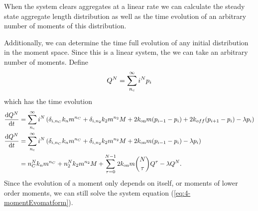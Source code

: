 When the system clears aggregates at a linear rate we can calculate the steady state aggregate length distribution as well as the time evolution of an arbitrary number of moments of this distribution.

Additionally, we can determine the time full evolution of any initial distribution in the moment space. Since this is a linear system, the we can take an arbitrary number of moments. Define
\begin{equation}
    Q^{N} = \sum_{n_{\mathrm{c}}}^\infty i^N p_i
\end{equation}
which has the time evolution
\begin{equation}
\begin{split}
    \frac{\text{d}Q^{N}}{\text{d}t} &= \sum_{n_{\mathrm{c}}}^\infty i^N \left( \delta_{i, n_C}k_n m^{n_C} + \delta_{i, n_2} k_2 m^{n_2} M + 2k_\text{on} m (p_{i-1}-p_i) + 2k_{off} (p_{i+1}-p_i) - \lambda p_i \right) \\
    \frac{\text{d}Q^{N}}{\text{d}t} &= \sum_{n_{\mathrm{c}}}^\infty i^N \left( \delta_{i, n_C}k_n m^{n_C} + \delta_{i, n_2} k_2 m^{n_2} M + 2k_\text{on} m (p_{i-1}-p_i) - \lambda p_i \right) \\
    &=n_C^N k_n m^{n_C} + n_2^N k_2 m^{n_2} M + \sum_{\tau=0}^{N-1} 2k_\text{on} m \binom{N}{\tau} Q^{\tau} - \lambda Q^{N}.
\end{split}
\end{equation}
Since the evolution of a moment only depends on itself, or moments of lower order moments, we can still solve the system equation (\ref{eq:4-momentEvomatform}).


